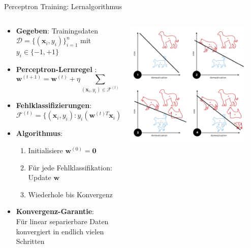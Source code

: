 \documentclass[aspectratio=1610, xcolor=dvipsnames, 9pt]{beamer}
\begin{document}
      \begin{frame}{Perceptron Training: Lernalgorithmus}
        \begin{columns}
          \begin{column}{0.7\textwidth}
            \begin{itemize}
              \item \textbf{Gegeben}: Trainingsdaten $\mathcal{D} = \{(\mathbf{x}_i, y_i)\}_{i=1}^n$ mit $y_i \in \{-1, +1\}$
              \item \textbf{Perceptron-Lernregel} \cite{rosenblatt1958}:
              \begin{equation}
                \mathbf{w}^{(t+1)} = \mathbf{w}^{(t)} + \eta \sum_{(\mathbf{x}_i, y_i) \in \mathcal{F}^{(t)}} y_i \mathbf{x}_i
              \end{equation}
              \item \textbf{Fehlklassifizierungen}: \\
                    $\mathcal{F}^{(t)} = \{(\mathbf{x}_i, y_i) : y_i(\mathbf{w}^{(t)T}\mathbf{x}_i) \leq 0\}$
              \item \textbf{Algorithmus}:
              \begin{enumerate}
                \item Initialisiere $\mathbf{w}^{(0)} = \mathbf{0}$
                \item Für jede Fehlklassifikation: Update $\mathbf{w}$
                \item Wiederhole bis Konvergenz
              \end{enumerate}
              \item \textbf{Konvergenz-Garantie}: \\
                    Für linear separierbare Daten konvergiert in endlich vielen Schritten
            \end{itemize}
          \end{column}
          \begin{column}{0.3\textwidth}
            \centering
            \includegraphics[width=0.9\textwidth]{images/Perceptron_example.svg.png}

\end{column}
\end{columns}
\end{frame}
\end{document}
